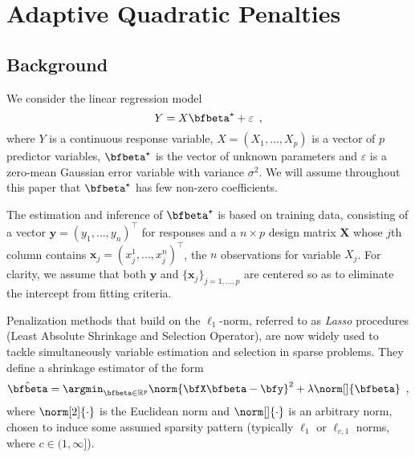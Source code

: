 \section{Adaptive Quadratic Penalties \label{sec:adaptquadra}}

\subsection{Background}

We consider the linear regression model 
\begin{equation}
  \label{eq:linear_reg_group}
  Y = X \bfbeta^\star + \varepsilon
  \enspace,
\end{equation}
where $Y$ is a continuous response variable, $X=(X_1,\dots,X_p)$ is a vector of
$p$ predictor variables, $\bfbeta^\star$ is the vector of unknown parameters and
$\varepsilon$ is a zero-mean Gaussian error variable with variance $\sigma^2$.
We will assume throughout this paper that $\bfbeta^\star$ has few non-zero
coefficients.

The estimation and inference of $\bfbeta^\star$ is based on training data,
consisting of a vector
$\mathbf{y}=(y_1,\dots,y_n)^\intercal$ for responses and a
$n\times  p$ design  matrix $\mathbf{X}$  whose $j$th  column contains
$\mathbf{x}_j  = (x_j^1,\dots,x_j^n)^\intercal$, the  $n$ observations
for variable $X_j$.  For  clarity, we assume that both $\mathbf{y}$
and $\{\mathbf{x}_j\}_{j=1,\dots,p}$ are centered so as to eliminate the
intercept from fitting criteria.

Penalization methods that build on the $\ell_1$-norm, referred to as
\emph{Lasso} procedures (Least Absolute Shrinkage and Selection Operator), are
now widely used to tackle simultaneously variable estimation and selection in
sparse problems.  They define a shrinkage estimator of the form
\begin{equation}\label{eq:general:original}
  \hat{\bfbeta} = \argmin_{\bfbeta\in\mathbb{R}^p} 
    \norm{\bfX \bfbeta - \bfy}^2 + 
    \lambda \norm[]{\bfbeta}
  \enspace, 
\end{equation}
where $\norm[2]{\cdot}$ is the Euclidean norm and $\norm[]{\cdot}$ is an
arbitrary norm, chosen to induce some assumed sparsity pattern (typically
$\ell_1$ or $\ell_{c,1}$ norms, where $c \in (1,\infty]$).
%

